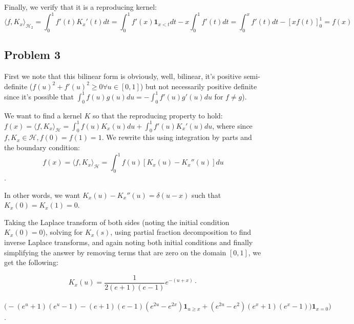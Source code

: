 \documentclass[12pt]{article}
\begin{document}
Finally, we verify that it is a reproducing kernel:
$$\langle f, K_x \rangle_{\mathcal{H}_2} = \int_0^1 f'(t) K_x'(t) dt = \int_0^1 f'(x)\mathbf{1}_{x<t} dt - x\int_0^1f'(t)dt = \int_0^x f'(t) dt - [xf(t)]_0^1 = f(x)$$




\subsection{Problem 3}
First we note that this bilinear form is obviously, well, bilinear, it's positive semi-definite ($f(u)^2 + f'(u)^2 \geq 0 \forall u \in [0,1]$) but not necessarily positive definite since it's possible that $\int_0^1 f(u)g(u) du = -\int_0^1 f'(u)g'(u)du$ for $f \neq g$).

We want to find a kernel $K$ so that the reproducing property to hold: $f(x) = \langle f, K_x \rangle_\mathcal{H} =  \int_0^1 f(u)K_x(u)du + \int_0^1 f'(u)K_x'(u)du$, where since $f, K_x \in \mathcal{H}, f(0) = f(1) = 1$. We rewrite this using integration by parts and the boundary condition:
$$f(x) = \langle f, K_x \rangle_\mathcal{H} = \int_0^1 f(u)[K_x(u) - K_x''(u)]du$$.

In other words, we want $K_x(u) - K_x''(u) = \delta(u-x)$ such that $K_x(0) = K_x(1) = 0$. %

Taking the Laplace transform of both sides (noting the initial condition $K_x(0)=0$), solving for $K_x(s)$, using partial fraction decomposition to find inverse Laplace transforms, and again noting both initial conditions and finally simplifying the answer by removing terms that are zero on the domain $[0,1]$, we get the following:

$$K_x(u) = \frac{1}{2(e+1)(e-1)}e^{-(u+x)} \cdot $$ \\
$$\bigg(-(e^u+1)(e^u-1) -(e+1)(e-1)(e^{2u}-e^{2x})\mathbf{1}_{u\geq x} + (e^{2u}-e^2)(e^x + 1)(e^x-1))\mathbf{1}_{x=0}\bigg)$$.
\end{document}
